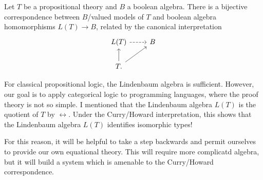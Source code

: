 \documentclass{../thesis-note}
\begin{document}
\begin{proposition}
  Let \(T\) be a propositional theory and \(B\) a boolean algebra. There is a
  bijective correspondence between \(B\)\-/valued models of \(T\) and boolean
  algebra homomorphisms \(L(T) \to B\), related by the canonical interpretation
  \[%
    \begin{tikzcd}
      L(T) \arrow[r,dashed] & B\\
      T. \arrow[u] \arrow[ur] &
    \end{tikzcd}
  \]%
\end{proposition}
For classical propositional logic, the Lindenbaum algebra is
sufficient. However, our goal is to apply categorical logic to programming
languages, where the proof theory is not so simple. I mentioned that the
Lindenbaum algebra \(L(T)\) is the quotient of \(T\) by
\(\leftrightarrow\). Under the Curry\-/Howard interpretation, this shows that
the Lindenbaum algebra \(L(T)\) identifies isomorphic types!

For this reason, it will be helpful to take a step backwards and permit
ourselves to provide our own equational theory. This will require more
complicatd algebra, but it will build a system which is amenable to the
Curry\-/Howard correspondence.
\end{document}
